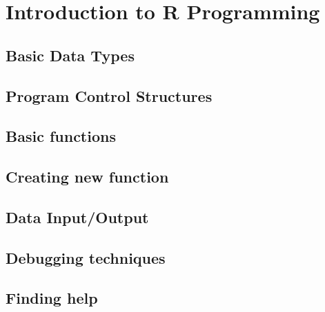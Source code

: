 \section{Introduction to R Programming}

\subsection{Basic Data Types}

\subsection{Program Control Structures}
\subsection{Basic functions}
\subsection{Creating new function}
\subsection{Data Input/Output}
\subsection{Debugging techniques}
\subsection{Finding help}
\endinput
